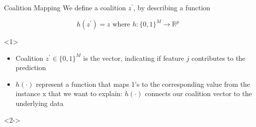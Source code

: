 \documentclass[11pt,compress,t,notes=noshow, aspectratio=169, xcolor=table]{beamer}
\begin{document}
\begin{vbframe}{Coalition Mapping}
We define a coalition $z^{\prime}$, by describing a function 

$$
h\left(z^{\prime}\right)=z \text { where } h:\{0,1\}^{M} \rightarrow \mathbb{R}^{p}
$$


\begin{onlyenv}<1>
\vspace{1cm}
\begin{itemize}
    \item Coalition $z^{\prime} \in \{0, 1\}^M$ is the  vector, indicating if feature $j$ contributes to the prediction 
    \item $h(\cdot)$ represent a function that maps 1’s to the corresponding value from the instance x that we want to explain: $h(\cdot)$ connects our coalition vector to the underlying data 
\end{itemize}
\end{onlyenv}

\begin{onlyenv}<2->
\begin{tikzpicture}
\centering


\end{tikzpicture}
\end{onlyenv}
\end{vbframe}
\end{document}
